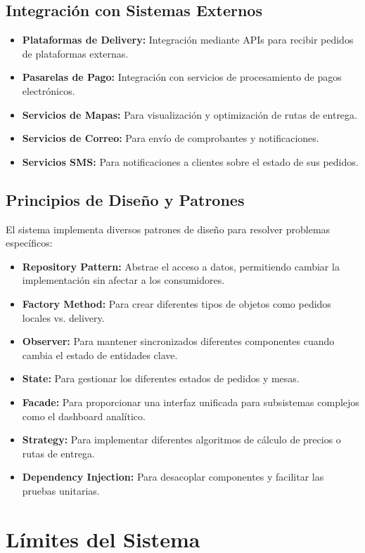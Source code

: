 \documentclass[12pt]{article}
\begin{document}
\subsection{Integración con Sistemas Externos}
\begin{itemize}
  \item \textbf{Plataformas de Delivery:} Integración mediante APIs para recibir pedidos de plataformas externas.
  \item \textbf{Pasarelas de Pago:} Integración con servicios de procesamiento de pagos electrónicos.
  \item \textbf{Servicios de Mapas:} Para visualización y optimización de rutas de entrega.
  \item \textbf{Servicios de Correo:} Para envío de comprobantes y notificaciones.
  \item \textbf{Servicios SMS:} Para notificaciones a clientes sobre el estado de sus pedidos.
\end{itemize}

\subsection{Principios de Diseño y Patrones}
El sistema implementa diversos patrones de diseño para resolver problemas específicos:

\begin{itemize}
  \item \textbf{Repository Pattern:} Abstrae el acceso a datos, permitiendo cambiar la implementación sin afectar a los consumidores.
  \item \textbf{Factory Method:} Para crear diferentes tipos de objetos como pedidos locales vs. delivery.
  \item \textbf{Observer:} Para mantener sincronizados diferentes componentes cuando cambia el estado de entidades clave.
  \item \textbf{State:} Para gestionar los diferentes estados de pedidos y mesas.
  \item \textbf{Facade:} Para proporcionar una interfaz unificada para subsistemas complejos como el dashboard analítico.
  \item \textbf{Strategy:} Para implementar diferentes algoritmos de cálculo de precios o rutas de entrega.
  \item \textbf{Dependency Injection:} Para desacoplar componentes y facilitar las pruebas unitarias.
\end{itemize}

\section{Límites del Sistema}
\end{document}
